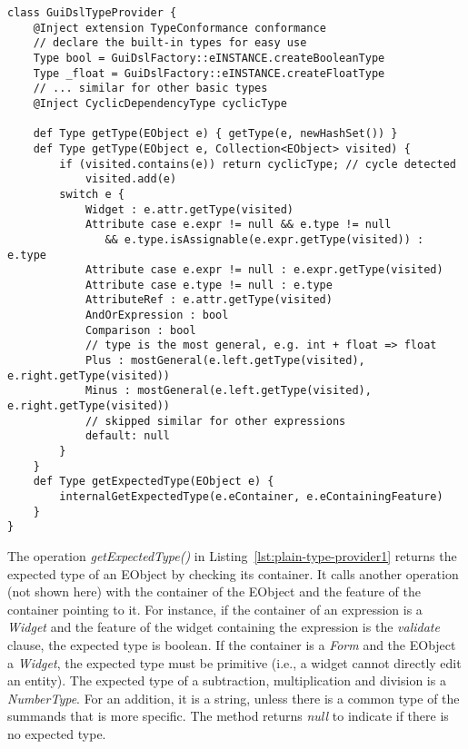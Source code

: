 \begin{lstlisting}[language=xtend,float=tb,label=lst:plain-type-provider1,caption=Type provider in Xtend.] 
class GuiDslTypeProvider {
	@Inject extension TypeConformance conformance
	// declare the built-in types for easy use
	Type bool = GuiDslFactory::eINSTANCE.createBooleanType
	Type _float = GuiDslFactory::eINSTANCE.createFloatType
	// ... similar for other basic types
	@Inject CyclicDependencyType cyclicType

	def Type getType(EObject e) { getType(e, newHashSet()) }
	def Type getType(EObject e, Collection<EObject> visited) {
		if (visited.contains(e)) return cyclicType; // cycle detected
			visited.add(e)
		switch e {
			Widget : e.attr.getType(visited)
			Attribute case e.expr != null && e.type != null 
			   && e.type.isAssignable(e.expr.getType(visited)) : e.type
			Attribute case e.expr != null : e.expr.getType(visited)
			Attribute case e.type != null : e.type
			AttributeRef : e.attr.getType(visited)
			AndOrExpression : bool 
			Comparison : bool
			// type is the most general, e.g. int + float => float
			Plus : mostGeneral(e.left.getType(visited), e.right.getType(visited))
			Minus : mostGeneral(e.left.getType(visited), e.right.getType(visited))
			// skipped similar for other expressions
			default: null
		}
	} 
	def Type getExpectedType(EObject e) {
		internalGetExpectedType(e.eContainer, e.eContainingFeature) 
	} 
}
\end{lstlisting}

The operation \emph{getExpectedType()} in Listing~\ref{lst:plain-type-provider1}
returns the expected type of an EObject by checking its container. It calls
another operation (not shown here) with the container of the EObject and the
feature of the container pointing to it. For instance, if the container of an
expression is a \emph{Widget} and the feature of the widget containing the
expression is the \emph{validate} clause, the expected type is boolean. If the
container is a \emph{Form} and the EObject a \emph{Widget}, the expected type
must be primitive (i.e., a widget cannot directly edit an entity).
The expected type of a subtraction, multiplication and division is a
\emph{NumberType}. For an addition, it is a string, unless there is a common
type of the summands that is more specific. The method returns \emph{null} to
indicate if there is no expected type.

